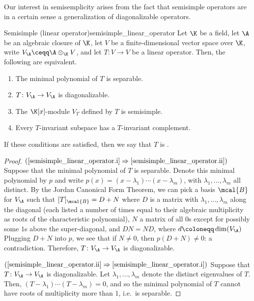 Our interest in semisemplicity arises from the fact that semisimple operators are in a certain sense a generalization of diagonalizable operators.
\begin{thm}{Semisimple (linear operator)}{semisimple_linear_operator}
	Let $\K$ be a field, let $\A$ be an algebraic closure of $\K$, let $V$ be a finite-dimensional vector space over $\K$, write $V_{\A}\ceqq \A \otimes _{\K}V$, and let $T\colon V\rightarrow V$ be a linear operator.  Then, the following are equivalent.
	\begin{enumerate}
		\item \label{semisimple_linear_operator.i}The minimal polynomial of $T$ is separable.
		\item \label{semisimple_linear_operator.ii}$T\colon V_{\A}\rightarrow V_{\A}$ is diagonalizable.
		\item \label{semisimple_linear_operator.iii}The $\K [x]$-module $V_T$ defined by $T$ is semisimple.
		\item \label{semisimple_linear_operator.iv}Every $T$-invariant subspace has a $T$-invariant complement.
	\end{enumerate}
	\begin{rmk}
		If these conditions are satisfied, then we say that $T$ is .
	\end{rmk}
	\begin{proof}
		$(\cref{semisimple_linear_operator.i}\Rightarrow \cref{semisimple_linear_operator.ii})$ Suppose that the minimal polynomial of $T$ is separable.  Denote this minimal polynomial by $p$ and write $p(x)=(x-\lambda _1)\cdots (x-\lambda _m)$, with $\lambda _1,\ldots ,\lambda _m$ all distinct.  By the Jordan Canonical Form Theorem, we can pick a basis $\mcal{B}$ for $V_{\A}$ such that $[T]_{\mcal{B}}=D+N$ where $D$ is a matrix with $\lambda _1,\ldots ,\lambda _m$ along the diagonal (each listed a number of times equal to their algebraic multiplicity as roots of the characteristic polynomial), $N$ a matrix of all $0$s except for possibly some $1$s above the super-diagonal, and $DN=ND$, where $d\coloneqq \dim (V_{\A})$  Plugging $D+N$ into $p$, we see that if $N\neq 0$, then $p(D+N)\neq 0$:  a contradiction.  Therefore, $T\colon V_{\A}\rightarrow V_{\A}$ is diagonalizable.
		
		\blankline
		\noindent
		$(\cref{semisimple_linear_operator.ii}\Rightarrow \cref{semisimple_linear_operator.i})$ Suppose that $T\colon V_{\A}\rightarrow V_{\A}$ is diagonalizable.  Let $\lambda _1,\ldots ,\lambda _m$ denote the distinct eigenvalues of $T$.  Then, $(T-\lambda _1)\cdots (T-\lambda _m)=0$, and so the minimal polynomial of $T$ cannot have roots of multiplicity more than $1$, i.e.~is separable.
		

\end{proof}
\end{thm}
